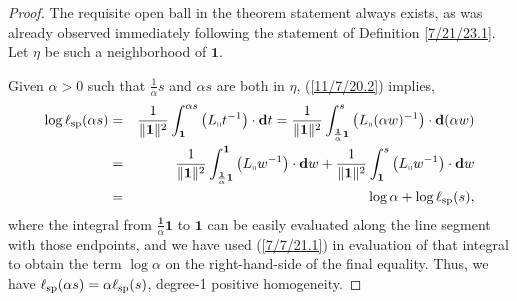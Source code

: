 \documentclass{amsart}
\theoremstyle{definition}
\numberwithin{theorem}{section}
\numberwithin{equation}{section}
\begin{document}
\begin{proof}  The requisite open ball in the theorem statement always exists, as was already observed immediately following the statement of Definition \ref{7/21/23.1}.  Let $\eta$ be such a neighborhood of $\mathbf{1}$.

Given $\alpha>0$ such that $\frac{1}{\alpha}s$ and $\alpha s$ are both in $\eta$, (\ref{11/7/20.2}) implies,
\begin{eqnarray}\nonumber  \log\ell_{\rm sp}(\alpha s) &=&  \frac{1}{\|{\bf 1}\|^2}\int_{\bf 1}^{\alpha s} \left(L_{\shortparallel}t^{-1}\right)\cdot \mathbf{d}t = \frac{1}{\|{\bf 1}\|^2}\int_{\frac{\mathbf{1}}{\alpha}\mathbf{1}}^{s} \left(L_{\shortparallel}(\alpha w)^{-1}\right)\cdot \mathbf{d}(\alpha w)  \\ \nonumber &=& \frac{1}{\|{\bf 1}\|^2}\int_{\frac{\mathbf{1}}{\alpha} \mathbf{1}}^{\mathbf{1}} \left(L_{\shortparallel}w^{-1}\right)\cdot \mathbf{d}w  +  \frac{1}{\|{\bf 1}\|^2}\int_{\mathbf{1}}^{s} \left(L_{\shortparallel}w^{-1}\right)\cdot \mathbf{d}w  \\ &=&   \log\alpha + \log \ell_{\rm sp}(s), \label{4/2/23.1}
\end{eqnarray} where the integral from $\frac{\mathbf{1}}{\alpha} \mathbf{1}$ to $\mathbf{1}$ can be easily evaluated along the line segment with those endpoints, and we have used (\ref{7/7/21.1}) in evaluation of that integral to  obtain the term $\log \alpha$ on the right-hand-side of the final equality.  Thus, we have $\ell_{\rm sp}(\alpha s) = \alpha\ell_{\rm sp}(s)$, degree-1 positive homogeneity.



\end{proof}
\end{document}
